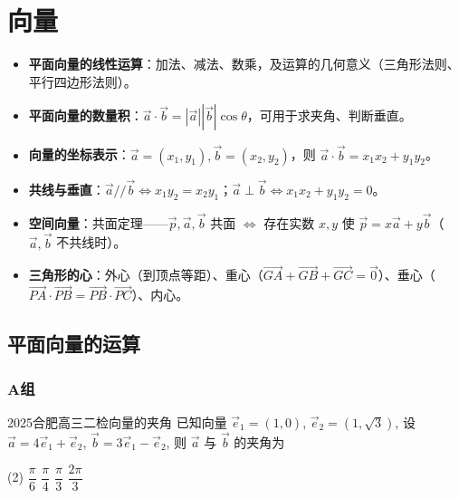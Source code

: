 \chapter{向量}
\setcounter{choicecounter}{0}

\begin{knowledgeframe}
\begin{itemize}
	\item \textbf{平面向量的线性运算}：加法、减法、数乘，及运算的几何意义（三角形法则、平行四边形法则）。
	\item \textbf{平面向量的数量积}：$\vec{a}\cdot\vec{b}=|\vec{a}||\vec{b}|\cos\theta$，可用于求夹角、判断垂直。
	\item \textbf{向量的坐标表示}：$\vec{a}=(x_1,y_1), \vec{b}=(x_2,y_2)$，则 $\vec{a}\cdot\vec{b}=x_1x_2+y_1y_2$。
	\item \textbf{共线与垂直}：$\vec{a}//\vec{b} \iff x_1y_2=x_2y_1$；$\vec{a}\perp\vec{b} \iff x_1x_2+y_1y_2=0$。
	\item \textbf{空间向量}：共面定理——$\vec{p},\vec{a},\vec{b}$ 共面 $\iff$ 存在实数 $x,y$ 使 $\vec{p}=x\vec{a}+y\vec{b}$（$\vec{a},\vec{b}$ 不共线时）。
	\item \textbf{三角形的心}：外心（到顶点等距）、重心（$\overrightarrow{GA}+\overrightarrow{GB}+\overrightarrow{GC}=\vec{0}$）、垂心（$\overrightarrow{PA}\cdot\overrightarrow{PB}=\overrightarrow{PB}\cdot\overrightarrow{PC}$）、内心。
\end{itemize}
\end{knowledgeframe}

\section{平面向量的运算}

\startexercise

\subsection*{A组}

\begin{choice}{2025合肥高三二检}{向量的夹角}
	已知向量 $\vec{e}_1=(1,0)$, $\vec{e}_2=(1,\sqrt{3})$, 设 $\vec{a}=4\vec{e}_1+\vec{e}_2$, $\vec{b}=3\vec{e}_1-\vec{e}_2$, 则 $\vec{a}$ 与 $\vec{b}$ 的夹角为
	\begin{tasks}(2)
		\task $\dfrac{\pi}{6}$
		\task $\dfrac{\pi}{4}$
		\task $\dfrac{\pi}{3}$
		\task $\dfrac{2\pi}{3}$
	\end{tasks}
\end{choice}

